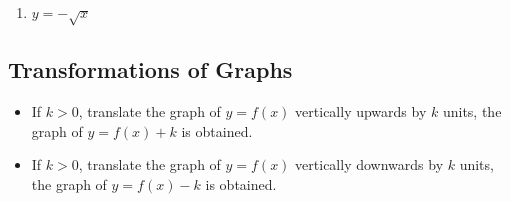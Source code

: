 \documentclass{report}
\begin{document}
\begin{enumerate}[label=(\alph*)]
  \item $y = -\sqrt{x}$
        \begin{center}
        \end{center}
\end{enumerate}

\subsection*{Transformations of Graphs}

\begin{mdframed}[style=MyFrame]
  \begin{itemize}[leftmargin=0.3cm]
    \item If $k > 0$, translate the graph of $y = f(x)$ vertically upwards by $k$ units,
          the graph of $y = f(x) + k$ is obtained.

    \item If $k > 0$, translate the graph of $y = f(x)$ vertically downwards by $k$
          units, the graph of $y = f(x) - k$ is obtained.
  \end{itemize}
\end{mdframed}
\end{document}
